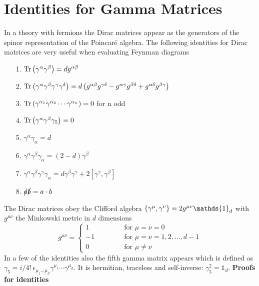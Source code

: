 \section{Identities for Gamma Matrices}
\label{app:Traceology}
In a theory with fermions the Dirac matrices appear as the generators of the spinor representation of the Poincaré algebra. The following identities for Dirac matrices are very useful when evaluating Feynman diagrams
\begin{itemize}
\item[1.] $\mathrm{Tr} \left( \gamma^{\alpha} \gamma^{\beta} \right) = dg^{\alpha\beta}$ \numberitem\label{eqn:Tr2g}

\item[2.] $\mathrm{Tr} \left( \gamma^{\alpha}\gamma^{\beta}\gamma^{\gamma}\gamma^{\delta} \right) = d \left( g^{\alpha\beta}g^{\gamma\delta} - g^{\alpha\gamma}g^{\beta\delta} + g^{\alpha\delta}g^{\beta\gamma} \right)$ \numberitem\label{eqn:Tr4g}

\item[3.] $\mathrm{Tr} \left( \gamma^{\alpha_1}\gamma^{\alpha_2} \cdots \gamma^{\alpha_n} \right) = 0$ \quad for n odd \numberitem\label{eqn:Troddg}

\item[4.] $\mathrm{Tr} \left( \gamma^{\alpha}\gamma^{\beta} \gamma_5 \right) = 0$ \numberitem\label{eqn:Tr2g5}

\item[5.] $\gamma^{\alpha}\gamma_{\alpha} = d$ \numberitem\label{eqn:2g}

\item[6.] $\gamma^{\alpha}\gamma^{\beta}\gamma_{\alpha} = \left( 2-d \right) \gamma^{\beta}$ \numberitem\label{eqn:3g}

\item[7.] $\gamma^{\alpha}\gamma^{\beta}\gamma^{\gamma}\gamma_{\alpha} = d\gamma^{\beta}\gamma^{\gamma} + 2 \left[ \gamma^{\gamma}, \gamma^{\beta} \right]$ \numberitem\label{eqn:4g}

\item[8.] $\slashed{a}\slashed{b} = a \cdot b$ \numberitem\label{eqn:fsldot}

\end{itemize}
The Dirac matrices obey the Clifford algebra $\lbr \gamma^{\mu}, \gamma^{\nu} \rbr = 2 g^{\mu\nu} \mathds{1}_d$ with $g^{\mu\nu}$ the Minkowski metric in $d$ dimensions
\begin{equation*}
 g^{\mu\nu} = 
\begin{cases}
1 \quad\qquad\qquad \text{for } \mu = \nu = 0 \\
-1 \ \qquad\qquad \text{for } \mu = \nu = 1,2,\ldots,d-1 \\
0 \quad\qquad\qquad \text{for } \mu \neq \nu
\end{cases}
\end{equation*}
In a few of the identities also the fifth gamma matrix appears which is defined as $\gamma_5 = i/4! \ \epsilon_{\mu_1 \dots \mu_d} \gamma^{\mu_1} \cdots \gamma^{\mu_d}$. It is hermitian, traceless and self-inverse: $\gamma_5^2 = \mathds{1}_d$.
\newpage
{\bf Proofs for identities}\\


